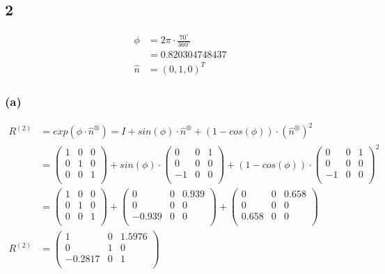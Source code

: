 \documentclass{../Vorlage/mat}
\begin{document}
\subsection*{2}
\begin{align*}
\phi & = 2 \pi \cdot \frac{70^{\circ}}{360^{\circ}}\\
& = 0.820304748437 \\
\hat{n} & = (0,1,0)^T
\end{align*}
\subsubsection*{(a)}
\begin{align*}
R^{(2)} & = exp(\phi \cdot \hat{n}^\otimes) = I + sin(\phi) \cdot \hat{n}^\otimes + (1 - cos(\phi)) \cdot (\hat{n}^\otimes)^2\\
& = 
\begin{pmatrix}
1 & 0 & 0 \\
0 & 1 & 0\\
0 & 0 & 1 \\
\end{pmatrix} + sin(\phi) \cdot
\begin{pmatrix}
0 & 0 & 1 \\
0 & 0 & 0 \\
-1 & 0 & 0 \\
\end{pmatrix} + (1 - cos(\phi)) \cdot
\begin{pmatrix}
0 & 0 & 1 \\   
0 & 0 & 0 \\
-1 & 0 & 0 \\
\end{pmatrix}^2 						\\
& = 
\begin{pmatrix}
1 & 0 & 0 \\
0 & 1 & 0\\
0 & 0 & 1 \\
\end{pmatrix} +
\begin{pmatrix}
0 & 0 & 0.939 \\
0 & 0 & 0 \\
-0.939 & 0 & 0 \\
\end{pmatrix} + 
\begin{pmatrix}
0 & 0 & 0.658 \\   
0 & 0 & 0 \\
0.658 & 0 & 0 \\
\end{pmatrix} 						\\
R^{(2)} & =  
\begin{pmatrix}
1 & 0 & 1.5976 \\
0 & 1 & 0\\
-0.2817 & 0 & 1 \\
\end{pmatrix}
\end{align*}
\end{document}
